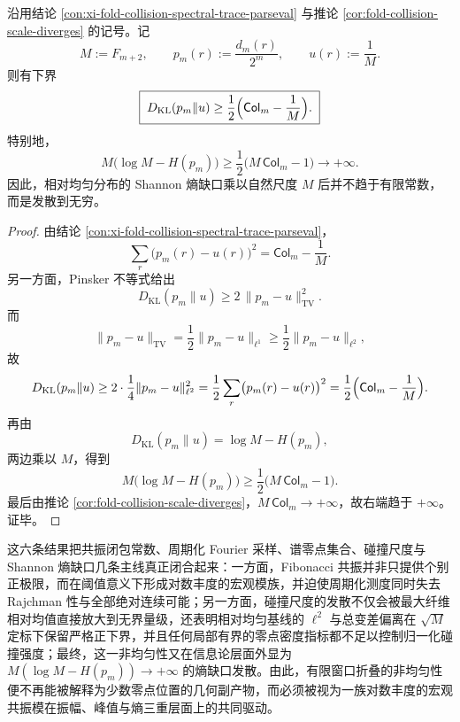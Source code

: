 \begin{theorem}\label{thm:xi-time-part66-shannon-gap-times-M-diverges}
沿用结论 \ref{con:xi-fold-collision-spectral-trace-parseval} 与推论
\ref{cor:fold-collision-scale-diverges} 的记号。记
\[
M:=F_{m+2},
\qquad
p_m(r):=\frac{d_m(r)}{2^m},
\qquad
u(r):=\frac{1}{M}.
\]
则有下界
\[
\boxed{\;
D_{\mathrm{KL}}(p_m\|u)\ge \frac12\Bigl(\mathsf{Col}_m-\frac1M\Bigr).\;}
\]
特别地，
\[
\boxed{\;
M\bigl(\log M-H(p_m)\bigr)
\ge
\frac12\bigl(M\,\mathsf{Col}_m-1\bigr)
\longrightarrow +\infty.\;}
\]
因此，相对均匀分布的 Shannon 熵缺口乘以自然尺度 \(M\) 后并不趋于有限常数，而是发散到无穷。
\end{theorem}
\begin{proof}
由结论 \ref{con:xi-fold-collision-spectral-trace-parseval}，
\[
\sum_r\bigl(p_m(r)-u(r)\bigr)^2
=
\mathsf{Col}_m-\frac1M.
\]
另一方面，Pinsker 不等式给出
\[
D_{\mathrm{KL}}(p_m\|u)\ge 2\,\|p_m-u\|_{\mathrm{TV}}^2.
\]
而
\[
\|p_m-u\|_{\mathrm{TV}}
=
\frac12\|p_m-u\|_{\ell^1}
\ge
\frac12\|p_m-u\|_{\ell^2},
\]
故
\[
D_{\mathrm{KL}}(p_m\|u)
\ge
2\cdot \frac14\|p_m-u\|_{\ell^2}^2
=
\frac12\sum_r\bigl(p_m(r)-u(r)\bigr)^2
=
\frac12\Bigl(\mathsf{Col}_m-\frac1M\Bigr).
\]
再由
\[
D_{\mathrm{KL}}(p_m\|u)=\log M-H(p_m),
\]
两边乘以 \(M\)，得到
\[
M\bigl(\log M-H(p_m)\bigr)
\ge
\frac12\bigl(M\,\mathsf{Col}_m-1\bigr).
\]
最后由推论 \ref{cor:fold-collision-scale-diverges}，\(M\,\mathsf{Col}_m\to+\infty\)，故右端趋于 \(+\infty\)。证毕。
\end{proof}

\noindent
这六条结果把共振闭包常数、周期化 Fourier 采样、谱零点集合、碰撞尺度与 Shannon 熵缺口几条主线真正闭合起来：一方面，Fibonacci 共振并非只提供个别正极限，而在阈值意义下形成对数丰度的宏观模族，并迫使周期化测度同时失去 Rajchman 性与全部绝对连续可能；另一方面，碰撞尺度的发散不仅会被最大纤维相对均值直接放大到无界量级，还表明相对均匀基线的 \(\ell^2\) 与总变差偏离在 \(\sqrt{M}\) 定标下保留严格正下界，并且任何局部有界的零点密度指标都不足以控制归一化碰撞强度；最终，这一非均匀性又在信息论层面外显为 \(M(\log M-H(p_m))\to+\infty\) 的熵缺口发散。由此，有限窗口折叠的非均匀性便不再能被解释为少数零点位置的几何副产物，而必须被视为一族对数丰度的宏观共振模在振幅、峰值与熵三重层面上的共同驱动。



\endinput
